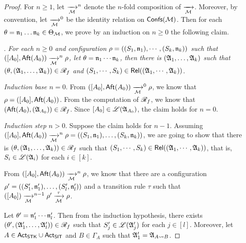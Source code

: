 \begin{proof}
For $n \ge 1$, let $\xrightarrow[{\mathcal{M} }]{}^n$ denote the $n$-fold composition of $\xrightarrow[{\mathcal{M} }]{}$. Moreover, by convention, let $\xrightarrow[{\mathcal{M} }]{}^0$ be the identity relation on ${\mathsf{Confs} }({\mathcal{M} })$. 
Then for each $\theta = \mathfrak{n}_1 \dots \mathfrak{n}_k \in \Theta_{\mathcal{M} }$, we prove by an induction on $n \ge 0$ the following claim.

\smallskip

. \emph{For each $n \ge 0$ and configuration $\rho =  ((S_1, \mathfrak{n}_1), \cdots, (S_k, \mathfrak{n}_k))$ such that 
%
$([A_0], {\sf Aft}(A_0)) \xrightarrow[{\mathcal{M} }]{}^n \rho$,  let $\theta  = \mathfrak{n}_1 \cdots \mathfrak{n}_k$, then 
%
there is  $({\mathfrak{A} }_1, \dots, {\mathfrak{A} }_k)$ such that $(\theta, ({\mathfrak{A} }_1, \dots, {\mathfrak{A} }_k)) \in \mathscr{R}_f$ and $(S_1, \cdots, S_k) \in \mathsf{Rel}(({\mathfrak{A} }_1,\cdots, {\mathfrak{A} }_k))$}.   


\smallskip

\noindent \emph{Induction base $n = 0$}. From $([A_0], {\sf Aft}(A_0)) \xrightarrow[{\mathcal{M} }]{}^0 \rho$, we know that $\rho = ([A_0], {\sf Aft}(A_0))$. From the computation of $\mathscr{R}_f$, we know that $({\sf Aft}(A_0), ({\mathfrak{A} }_{A_0})) \in \mathscr{R}_f$. Since $[A_0] \in {\mathscr{L} }({\mathfrak{A} }_{A_0})$, the claim holds for $n = 0$. 

\smallskip

\noindent \emph{Induction step $n > 0$}. Suppose the claim holds for $n-1$. Assuming $([A_0], {\sf Aft}(A_0)) \xrightarrow[{\mathcal{M} }]{}^n \rho =  ((S_1, \mathfrak{n}_1), \dots, (S_k, \mathfrak{n}_k))$, we are going to show that there is  $(\theta, ({\mathfrak{A} }_1, \dots, {\mathfrak{A} }_k)) \in \mathscr{R}_f$ such that $(S_1, \cdots, S_k) \in \mathsf{Rel}(({\mathfrak{A} }_1,\cdots, {\mathfrak{A} }_k))$, that is, $S_i \in {\mathscr{L} }({\mathfrak{A} }_i)$ for each $i \in [k]$. 

From $([A_0], {\sf Aft}(A_0)) \xrightarrow[{\mathcal{M} }]{}^n \rho$,  we know that there are a configuration $\rho' = ((S'_1, \mathfrak{n}'_1), \dots, (S'_l, \mathfrak{n}'_l))$ and a transition rule $\tau$ such that $([A_0]) \xrightarrow[{\mathcal{M} }]{}^{n-1} \rho' \xrightarrow[{\mathcal{M} }]{\tau} \rho$.

Let $\theta'= \mathfrak{n}'_1 \cdots \mathfrak{n}'_l$. Then from the induction hypothesis, there exists $(\theta', ({\mathfrak{A} }'_1, \dots, {\mathfrak{A} }'_l)) \in \mathscr{R}_f$ such that $S'_j \in {\mathscr{L} }({\mathfrak{A} }'_j)$ for each $j \in [l]$. Moreover, let $A \in {\sf Act}_{\sf STK}\cup{\sf Act}_{\sf SIT}$ and $B \in \Gamma_A$ such that ${\mathfrak{A} }'_1 = {\mathfrak{A} }_{A \rightsquigarrow B}$. 


\end{proof}
